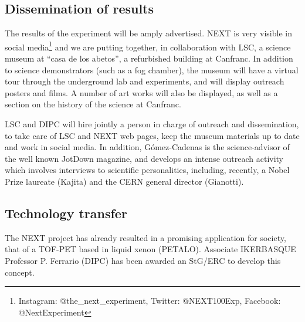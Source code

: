
\subsection{Dissemination of results}

\indent
The results of the experiment will be amply advertised. NEXT is very visible in social media\footnote{Instagram: @the\_next\_experiment,
Twitter: @NEXT100Exp,
Facebook: @NextExperiment} and we are putting together, in collaboration with LSC, a science museum at ``casa de los abetos'', a refurbished building at Canfranc. In addition to science demonstrators (such as a fog chamber), the museum will have a virtual tour through the underground lab and experiments, and will display outreach posters and films. A number of art works will also be displayed, as well as a section on the history of the science at Canfranc. 

\indent

LSC and DIPC will hire jointly a person in charge of outreach and dissemination, to take care of LSC and NEXT web pages, keep the museum materials up to date and work in social media. In addition, G\'omez-Cadenas
is the science-advisor of the well known JotDown magazine, and develops an intense outreach activity which involves interviews to scientific personalities, including, recently, a Nobel Prize laureate (Kajita) and the CERN general director (Gianotti).

\subsection{Technology transfer}
The NEXT project has already resulted in a promising application for society, that of a TOF-PET based in liquid xenon (PETALO). Associate IKERBASQUE Professor P. Ferrario (DIPC) has been awarded an StG/ERC to develop this concept.


